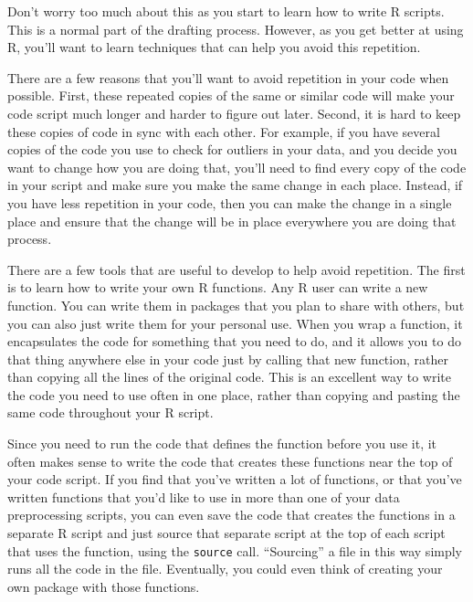 \documentclass[]{tufte-book}
\begin{document}
Don't worry too much about this as you start to learn how to write R scripts. This
is a normal part of the drafting process. However, as you get better at using R, you'll
want to learn techniques that can help you avoid this repetition.

There are a few reasons that you'll want to avoid repetition in your code when
possible. First, these repeated copies of the same or similar code will make your
code script much longer and harder to figure out later.
Second, it is hard to keep these copies of code in sync with each other. For example, if
you have several copies of the code you use to check for outliers in your data, and you
decide you want to change how you are doing that, you'll need to find every copy of
the code in your script and make sure you make the same change in each place. Instead,
if you have less repetition in your code, then you can make the change in a single place
and ensure that the change will be in place everywhere you are doing that process.

There are a few tools that are useful to develop to help avoid repetition. The
first is to learn how to write your own R functions. Any R user can write a new
function. You can write them in packages that you plan to share with others, but
you can also just write them for your personal use. When you wrap a function, it
encapsulates the code for something that you need to do, and it allows you to do
that thing anywhere else in your code just by calling that new function, rather
than copying all the lines of the original code. This is an excellent way to
write the code you need to use often in one place, rather than copying and
pasting the same code throughout your R script.

Since you need to run the code that defines the function before you use it, it
often makes sense to write the code that creates these functions near the top of
your code script. If you find that you've written a lot of functions, or that
you've written functions that you'd like to use in more than one of your data
preprocessing scripts, you can even save the code that creates the functions in
a separate R script and just source that separate script at the top of each
script that uses the function, using the \texttt{source} call. ``Sourcing'' a file in
this way simply runs all the code in the file. Eventually, you could
even think of creating your own package with those functions.
\end{document}
